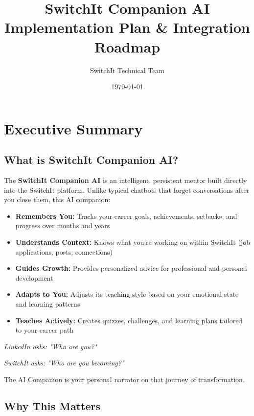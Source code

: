 \documentclass[12pt,a4paper]{article}
\title{\Huge\textbf{SwitchIt Companion AI} \\ \Large Implementation Plan \& Integration Roadmap}
\author{SwitchIt Technical Team}
\date{\today}
\begin{document}
\maketitle
\tableofcontents
\newpage

\section{Executive Summary}

\subsection{What is SwitchIt Companion AI?}

The \textbf{SwitchIt Companion AI} is an intelligent, persistent mentor built directly into the SwitchIt platform. Unlike typical chatbots that forget conversations after you close them, this AI companion:

\begin{itemize}[leftmargin=*]
    \item \textbf{Remembers You:} Tracks your career goals, achievements, setbacks, and progress over months and years
    \item \textbf{Understands Context:} Knows what you're working on within SwitchIt (job applications, posts, connections)
    \item \textbf{Guides Growth:} Provides personalized advice for professional and personal development
    \item \textbf{Adapts to You:} Adjusts its teaching style based on your emotional state and learning patterns
    \item \textbf{Teaches Actively:} Creates quizzes, challenges, and learning plans tailored to your career path
\end{itemize}

\begin{tcolorbox}[colback=switchitblue!10,colframe=switchitblue,title=\textbf{The Big Idea}]
\large
\textit{LinkedIn asks: "Who are you?"}

\vspace{0.3cm}
\textit{SwitchIt asks: "Who are you becoming?"}

\vspace{0.3cm}
The AI Companion is your personal narrator on that journey of transformation.
\end{tcolorbox}

\subsection{Why This Matters}
\end{document}
